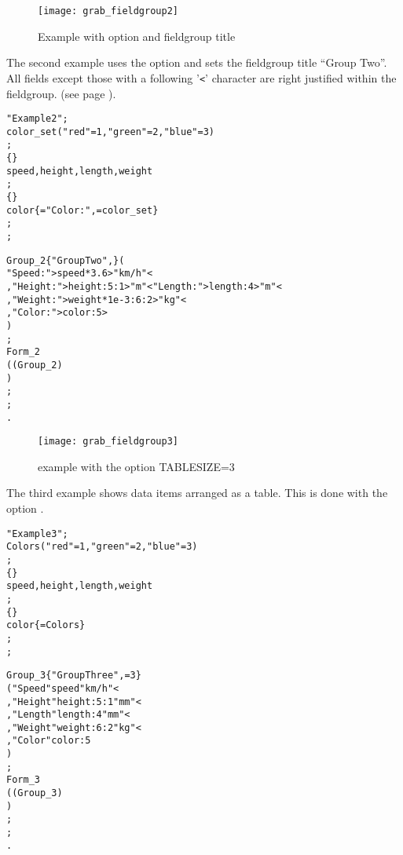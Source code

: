 \newpage

\begin{figure}\label{fig:fieldgroup2}
   \begin{center}
      \texttt{[image: grab\_fieldgroup2]}
   \end{center}
\caption{Example with option \JUSTRIGHT{} and fieldgroup title}
\end{figure}

The second example uses the option \JUSTRIGHT{} and sets the fieldgroup
title ``Group Two''. All fields except those with a following '\verb+<+' character
are right justified within the fieldgroup.
(see page \pageref{fig:fieldgroup2}).


\begin{boxedminipage}[t]{\linewidth}
\begin{alltt}
\DESCRIPTION "Example 2";
\DATAPOOL
  \SET
    color_set ("red" = 1, "green" = 2, "blue" = 3 )
  ;
  \REAL \{\EDITABLE\}
    speed, height, length, weight
  ;
  \INTEGER \{\EDITABLE\}
    color \{ \LABEL="Color:", \SET=color_set \}
  ;
\END \DATAPOOL;

\UIMANAGER
  \FIELDGROUP
    Group_2 \{"Group Two", \JUSTRIGHT\} (
      "Speed:">  speed*3.6>       "km/h"<
    , "Height:"> height:5:1>      "m"<    "Length:"> length:4> "m"<
    , "Weight:"> weight*1e-3:6:2> "kg"<   \VOID      \VOID     \VOID
    , \VOID      \VOID            \VOID   "Color:">  color:5>  \VOID
    )
  ;
  \FORM
    Form_2
      ( ( Group_2 )
      )
   ;
\END \UIMANAGER;
\END.
\end{alltt}
\end{boxedminipage}


\newpage

\begin{figure}\label{fig:fieldgroup3}
   \begin{center}
      \texttt{[image: grab\_fieldgroup3]}
   \end{center}
\caption{example with the option TABLESIZE=3}
\end{figure}

The third example shows data items arranged as a table.
This is done with the option \TABLESIZE{}.


\begin{boxedminipage}[t]{\linewidth}
\begin{alltt}
\DESCRIPTION "Example 3";
\DATAPOOL
  \SET
     Colors ("red" = 1,"green" = 2,"blue" = 3)
    ;
  \REAL \{\EDITABLE\}
    speed ,height ,length ,weight
  ;
  \INTEGER \{\EDITABLE\}
    color \{\SET = Colors\}
  ;
\END \DATAPOOL;

\UIMANAGER
  \FIELDGROUP
    Group_3 \{"Group Three", \TABLESIZE = 3 \}
      ( "Speed"    speed       "km/h"<
      , "Height"   height:5:1  "mm"<
      , "Length"   length:4    "mm"<
      , "Weight"   weight:6:2  "kg"<
      , "Color"    color:5
      )
   ;
  \FORM
    Form_3
      ( ( Group_3 )
      )
   ;
\END \UIMANAGER;
\END.
\end{alltt}
\end{boxedminipage}

